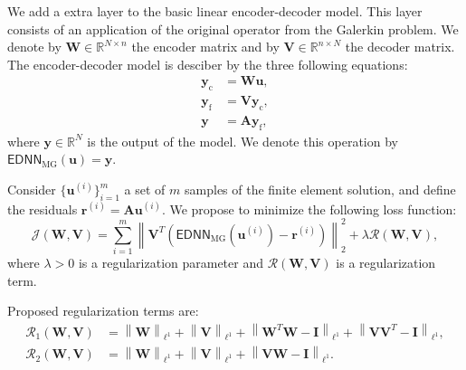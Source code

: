 We add a extra layer to the basic linear encoder-decoder model.
This layer consists of an application of the original operator from the Galerkin problem.
We denote by \(\mathbf{W} \in \mathbb{R}^{N \times n}\) the encoder matrix and by \(\mathbf{V} \in \mathbb{R}^{n \times N}\) the decoder matrix.
The encoder-decoder model is desciber by the three following equations:
\begin{subequations}
    \begin{align}
        \mathbf{y}_\mathrm{c} & = \mathbf{W} \mathbf{u}, \\
        \mathbf{y}_\mathrm{f} & = \mathbf{V} \mathbf{y}_\mathrm{c}, \\
        \mathbf{y} & = \mathbf{A} \mathbf{y}_\mathrm{f},
    \end{align}
\end{subequations}
where \(\mathbf{y} \in \mathbb{R}^{N}\) is the output of the model.
We denote this operation by \(\mathsf{EDNN}_\mathrm{MG}(\mathbf{u}) = \mathbf{y}\).

Consider \( \{ \mathbf{u}^{(i)} \}_{i=1}^{m} \) a set of \(m\) samples of the finite element solution, and define the residuals \(\mathbf{r}^{(i)} = \mathbf{A} \mathbf{u}^{(i)}\).
We propose to minimize the following loss function:
\begin{equation}
    \mathcal{J}(\mathbf{W}, \mathbf{V}) =
    \sum_{i=1}^{m} \left\lVert \mathbf{V}^T( \mathsf{EDNN}_\mathrm{MG}(\mathbf{u}^{(i)}) - \mathbf{r}^{(i)} ) \right\rVert_2^2 +
    \lambda \mathcal{R}(\mathbf{W}, \mathbf{V}),
\end{equation}
where \(\lambda > 0\) is a regularization parameter and \(\mathcal{R}(\mathbf{W}, \mathbf{V})\) is a regularization term.

Proposed regularization terms are:
\begin{subequations}
    \begin{align}
        \mathcal{R}_1(\mathbf{W}, \mathbf{V}) &
        = \left\lVert \mathbf{W} \right\rVert_{\ell^1} + \left\lVert \mathbf{V} \right\rVert_{\ell^1}
        + \left\lVert \mathbf{W}^T \mathbf{W} - \mathbf{I} \right\rVert_{\ell^1}
        + \left\lVert \mathbf{V} \mathbf{V}^T - \mathbf{I} \right\rVert_{\ell^1}, \\
        \mathcal{R}_2(\mathbf{W}, \mathbf{V}) &
        = \left\lVert \mathbf{W} \right\rVert_{\ell^1} + \left\lVert \mathbf{V} \right\rVert_{\ell^1}
        + \left\lVert \mathbf{V} \mathbf{W} - \mathbf{I} \right\rVert_{\ell^1}.
    \end{align}
\end{subequations}


